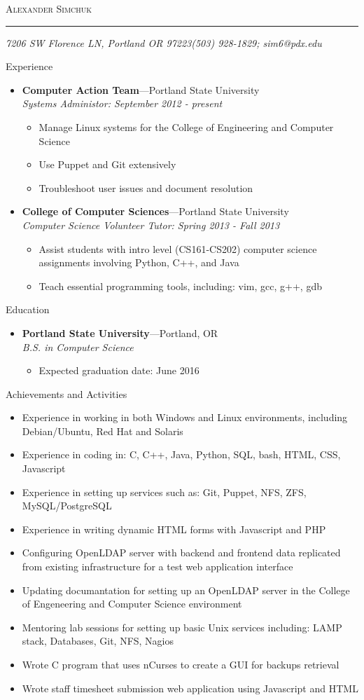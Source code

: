 \documentclass[11pt,oneside]{article}
\makeatletter
\newcommand{\name}{Alexander Simchuk}
\newcommand{\addr}{7206 SW Florence LN, Portland OR 97223}
\newcommand{\phone}{(503) 928-1829}
\newcommand{\email}{sim6@pdx.edu}
\newcommand{\bigname}[1]{
	\begin{center}\fontfamily{phv}\selectfont\Huge\scshape#1\end{center}
}
\newenvironment{ressection}[1]{
	\vspace{4pt}
	{\fontfamily{phv}\selectfont\Large#1}
	\begin{itemize}
	\vspace{3pt}
}{
	\end{itemize}
}
\newcommand{\resitem}[1]{
	\vspace{-4pt}
	\item \begin{flushleft} #1 \end{flushleft}
}
\newcommand{\ressubitem}[1]{
	\vspace{-1pt}
	\item \begin{flushleft} #1 \end{flushleft}
}
\newcommand{\resbigitem}[3]{
	\vspace{-5pt}
	\item
	\textbf{#1}---#2 \\
	\textit{#3}
}
\newenvironment{ressubsec}[3]{
	\resbigitem{#1}{#2}{#3}
	\vspace{-2pt}
	\begin{itemize}
}{
	\end{itemize}
}
\makeatother
\begin{document}
 \selectfont
\bigname{\name}
\vspace{-8pt} \rule{\textwidth}{1pt}
\vspace{-1pt} {\small\itshape \addr \hfill \phone; \email}
\vspace{8 pt}


\begin{ressection}{Experience}
    \begin{ressubsec}{Computer Action Team}{Portland State University}{Systems Administor: September 2012 - present}
		\ressubitem{Manage Linux systems for the College of Engineering and Computer Science}
		\ressubitem{Use Puppet and Git extensively}
		\ressubitem{Troubleshoot user issues and document resolution}
	\end{ressubsec}
	\begin{ressubsec}{College of Computer Sciences}{Portland State University}{Computer Science Volunteer Tutor: Spring 2013 - Fall 2013}
        \ressubitem{Assist students with intro level (CS161-CS202) computer science assignments involving Python, C++, and Java}
        \ressubitem{Teach essential programming tools, including: vim, gcc, g++, gdb}
	\end{ressubsec}
\end{ressection}


\begin{ressection}{Education}
    \begin{ressubsec}{Portland State University}{Portland, OR}{B.S. in Computer Science}
		\ressubitem{Expected graduation date: June 2016}
	\end{ressubsec}
\end{ressection}


\begin{ressection}{Achievements and Activities}
    \resitem{Experience in working in both Windows and Linux environments, including Debian/Ubuntu, Red Hat and Solaris}
    \resitem{Experience in coding in: C, C++, Java, Python, SQL, bash, HTML, CSS, Javascript}
    \resitem{Experience in setting up services such as: Git, Puppet, NFS, ZFS, MySQL/PostgreSQL}
    \resitem{Experience in writing dynamic HTML forms with Javascript and PHP}
    \resitem{Configuring OpenLDAP server with backend and frontend data replicated from existing infrastructure for a test web application interface}
    \resitem{Updating documantation for setting up an OpenLDAP server in the College of Engeneering and Computer Science environment}
    \resitem{Mentoring lab sessions for setting up basic Unix services including: LAMP stack, Databases, Git, NFS, Nagios}
    \resitem{Wrote C program that uses nCurses to create a GUI for backups retrieval}
    \resitem{Wrote staff timesheet submission web application using Javascript and HTML}
\end{ressection}
\end{document}
